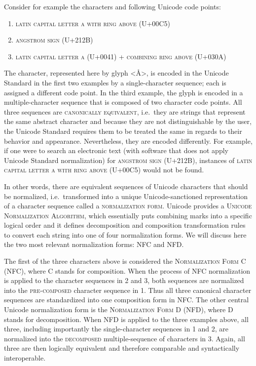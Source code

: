 Consider for example the characters and following Unicode code points:
\begin{enumerate}
	\def\labelenumi{\arabic{enumi}.} 
	\item \textsc{latin capital letter a with ring above} (U+00C5) 
	\item \textsc{angstrom sign} (U+212B) 
	\item \textsc{latin capital letter a} (U+0041) + \textsc{combining ring above} (U+030A) 
\end{enumerate}

The character, represented here by glyph <Å>, is encoded in the Unicode Standard in the first two examples by a single-character sequence; each is assigned a different code point. In the third example, the glyph is encoded in a multiple-character sequence that is composed of two character code points. All three sequences are \textsc{canonically equivalent}, i.e.~they are strings that represent the same abstract character and because they are not distinguishable by the user, the Unicode Standard requires them to be treated the same in regards to their behavior and appearance. Nevertheless, they are encoded differently. For example, if one were to search an electronic text (with software that does not apply Unicode Standard normalization) for \textsc{angstrom sign} (U+212B), instances of \textsc{latin capital letter a with ring above} (U+00C5) would not be found.

In other words, there are equivalent sequences of Unicode characters that should be normalized, i.e.~transformed into a unique Unicode-sanctioned representation of a character sequence called a \textsc{normalization form}. Unicode provides a \textsc{Unicode Normalization Algorithm}, which essentially puts combining marks into a specific logical order and it defines decomposition and composition transformation rules to convert each string into one of four normalization forms. We will discuss here the two most relevant normalization forms: NFC and NFD.

The first of the three characters above is considered the \textsc{Normalization Form C (NFC)}, where \textsc{C} stands for composition. When the process of NFC normalization is applied to the character sequences in 2 and 3, both sequences are normalized into the \textsc{pre-composed} character sequence in 1. Thus all three canonical character sequences are standardized into one composition form in NFC. The other central Unicode normalization form is the \textsc{Normalization Form D (NFD)}, where \textsc{D} stands for decomposition. When NFD is applied to the three examples above, all three, including importantly the single-character sequences in 1 and 2, are normalized into the \textsc{decomposed} multiple-sequence of characters in 3. Again, all three are then logically equivalent and therefore comparable and syntactically interoperable.

